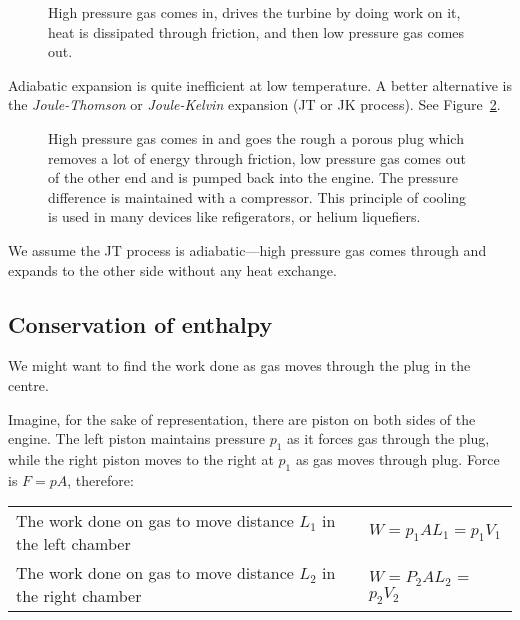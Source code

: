 \documentclass[12pt,chapterprefix=false,dvipsnames]{scrbook}
\theoremstyle{dotless}
\theoremstyle{definition}
\begin{document}
\begin{figure}[htpb]
	\centering
	
	\caption{High pressure gas comes in, drives the turbine by doing work on it, heat is dissipated through friction, and then low pressure gas comes out.}%
	\label{fig:turbine_cool_gas}
\end{figure}

Adiabatic expansion is quite inefficient at low temperature. A
better alternative is the \textit{Joule-Thomson} or
\textit{Joule-Kelvin} expansion (JT or JK process). See
Figure~\ref{fig:joule_thomson_expansion}.

\begin{figure}[htpb]
	\centering
	
	\caption{High pressure gas comes in and goes the rough a porous plug
		which removes a lot of energy through
		friction, low pressure gas comes out of the other end and is pumped back
		into the engine. The pressure difference is maintained with a
		compressor. This principle of cooling is used in many devices
		like refigerators, or helium liquefiers.}%
	\label{fig:joule_thomson_expansion}
\end{figure}

We assume the JT process is adiabatic---high pressure gas comes
through and expands to the other side without any heat exchange.

\subsection{Conservation of enthalpy}%
\label{sub:conservation_of_enthalpy}

We might want to find the work done as gas moves through the
plug in the centre.

Imagine, for the sake of representation, there are piston on
both sides of the engine. The left piston maintains pressure
$p_1$ as it forces gas through the plug, while
the right piston moves to the right at $p_1$
as gas moves through plug. Force is $F = pA$,
therefore:

\begin{tabular}{l l}
	The work done on gas to move distance $L_1$ in the left chamber  & $W = p_1 A L_1 = p_1 V_1$   \\
	The work done on gas to move distance $L_2$ in the right chamber & $W = P_2 A L_2$ = $p_2 V_2$ \\
\end{tabular}\\
\end{document}
